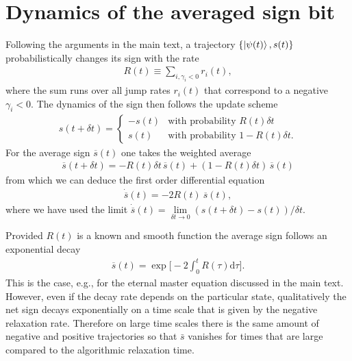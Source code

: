 \documentclass[twocolumn,prl,superscriptaddress]{revtex4-2}
\begin{document}
\section{Dynamics of the averaged sign bit}
Following the arguments in the main text, a trajectory $\{ \ket{ \psi(t)}, s(t) \}$ probabilistically changes its sign with the rate 
\begin{align}
	R(t) \equiv \sum_{i, \gamma_i < 0} r_i(t),
\end{align}
where the sum runs over all jump rates $r_i(t)$ that correspond to a negative $\gamma_i<0$. The dynamics of the sign then follows the update scheme 
\begin{align}
	s(t + \delta t) = \begin{cases}
		-s(t) & \text{with probability } R(t) \delta t \\
		s(t) & \text{with probability } 1 - R(t) \delta t. 
	\end{cases}
\end{align}
For the average sign $\overline s(t)$ one takes the weighted average
\begin{align}
	\overline s(t+\delta t) = - R(t)\delta t\, \overline s(t) + \left( 1-R(t) \delta t \right) \, \overline s(t) 
\end{align}
from which we can deduce the first order differential equation
\begin{align}
	\dot{\overline{s}}(t) = - 2 R(t)\ \overline{s}(t),
\end{align}
where we have used the limit $\dot{\overline{s}}(t)=\lim\limits_{\delta t\to 0} (s(t+\delta t) - s(t))/\delta t$.

Provided $R(t)$ is a known and smooth function the average sign follows an exponential decay 
\begin{align}
	\overline{s}(t) = \exp\Big[-2 \int_0^t R(\tau) \mathrm d \tau \Big].
\end{align}
This is the case, e.g., for the eternal master equation discussed in the main text. However, even if the decay rate depends on the particular state, qualitatively the net sign decays exponentially on a time scale that is given by the negative relaxation rate. Therefore on large time scales there is the same amount of negative and positive trajectories so that $\bar{s}$ vanishes for times that are large compared to the algorithmic relaxation time. 
\end{document}
